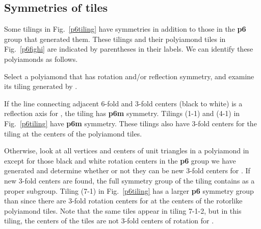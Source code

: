 \documentclass{ws-ijcga}
\begin{document}
\subsection{Symmetries of tiles}
Some tilings in Fig.~\ref{p6tiling} have symmetries in addition to those in the {\bf p6} group  
that generated them. 
These tilings and their polyiamond tiles in Fig.~\ref{p6fighi} are indicated by parentheses 
in their labels. We can identify these polyiamonds as follows.
\begin{itemlist}
\item
Select a polyiamond that has rotation and/or reflection symmetry, and examine its tiling 
generated by .
\item
If the line connecting adjacent 6-fold and 3-fold centers (black to white) is a reflection axis
for , the tiling has {\bf p6m} symmetry. 
Tilings (1-1) and (4-1) in Fig.~\ref{p6tiling} have {\bf p6m} symmetry.
These tilings also have 3-fold centers for the tiling at the centers of the polyiamond tiles.
\item
Otherwise, look at all vertices and centers of unit triangles in a polyiamond in  except for
those black and white rotation centers in the {\bf p6} group we have generated and determine whether
or not they can be new 3-fold centers for . 
If new 3-fold centers are found, the full symmetry 
group of the tiling contains  as a proper subgroup. 
Tiling (7-1) in Fig.~\ref{p6tiling} has a larger {\bf p6} symmetry group than  
since there are 3-fold rotation centers for  at the centers of the rotorlike polyiamond tiles. 
Note that the same tiles appear in tiling 7-1-2, but in this tiling, the centers
of the tiles are not 3-fold centers of rotation for .
\end{itemlist}
\end{document}
